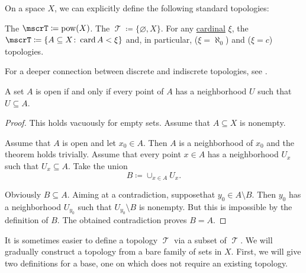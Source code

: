 \begin{definition}\label{def:standard_topologies}
  On a space \( X \), we can explicitly define the following standard topologies:
  \begin{DefEnum}
     The  \( \mscrT \coloneqq \Pow(X) \).
     The  \( \mscrT \coloneqq \{ \varnothing, X \} \).
     For any \hyperref[def:cardinal]{cardinal} \( \xi \), the  \( \mscrT \coloneqq \{ A \subseteq X \colon \Card A < \xi \} \) and, in particular,  (\( \xi = \aleph_0 \)) and  (\( \xi = c \)) topologies.
  \end{DefEnum}

  For a deeper connection between discrete and indiscrete topologies, see .
\end{definition}

\begin{proposition}\label{thm:set_open_iff_neighborhood_is_contained}
  A set \( A \) is open if and only if every point of \( A \) has a neighborhood \( U \) such that \( U \subseteq A \).
\end{proposition}
\begin{proof}
  This holds vacuously for empty sets. Assume that \( A \subseteq X \) is nonempty.

  \Sufficiency Assume that \( A \) is open and let \( x_0 \in A \). Then \( A \) is a neighborhood of \( x_0 \) and the theorem holds trivially.
  \Necessity Assume that every point \( x \in A \) has a neighborhood \( U_x \) such that \( U_x \subseteq A \). Take the union
  \begin{equation*}
    B \coloneqq \cup_{x \in A} U_x.
  \end{equation*}

  Obviously \( B \subseteq A \). Aiming at a contradiction, suppose\LEM that \( y_0 \in A \setminus B \). Then \( y_0 \) has a neighborhood \( U_{y_0} \) such that \( U_{y_0} \setminus B \) is nonempty. But this is impossible by the definition of \( B \). The obtained contradiction proves \( B = A \).
\end{proof}

\begin{remark}\label{rem:abritrary_family_to_topology}
  It is sometimes easier to define a topology \( \mscrT \) via a subset of \( \mscrT \). We will gradually construct a topology from a bare family of sets in \( X \). First, we will give two definitions for a base, one on which does not require an existing topology.
\end{remark}

